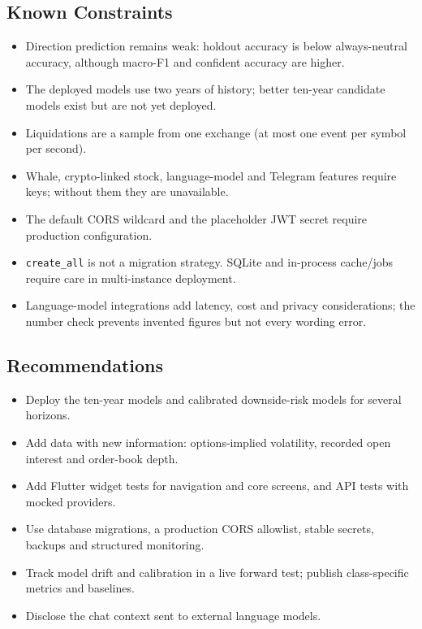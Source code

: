 \subsection{Known Constraints}
\begin{itemize}
\item Direction prediction remains weak: holdout accuracy is below always-neutral accuracy, although macro-F1 and confident accuracy are higher.
\item The deployed models use two years of history; better ten-year candidate models exist but are not yet deployed.
\item Liquidations are a sample from one exchange (at most one event per symbol per second).
\item Whale, crypto-linked stock, language-model and Telegram features require keys; without them they are unavailable.
\item The default CORS wildcard and the placeholder JWT secret require production configuration.
\item \texttt{create\_all} is not a migration strategy. SQLite and in-process cache/jobs require care in multi-instance deployment.
\item Language-model integrations add latency, cost and privacy considerations; the number check prevents invented figures but not every wording error.
\end{itemize}

\subsection{Recommendations}
\begin{itemize}
\item Deploy the ten-year models and calibrated downside-risk models for several horizons.
\item Add data with new information: options-implied volatility, recorded open interest and order-book depth.
\item Add Flutter widget tests for navigation and core screens, and API tests with mocked providers.
\item Use database migrations, a production CORS allowlist, stable secrets, backups and structured monitoring.
\item Track model drift and calibration in a live forward test; publish class-specific metrics and baselines.
\item Disclose the chat context sent to external language models.
\end{itemize}

